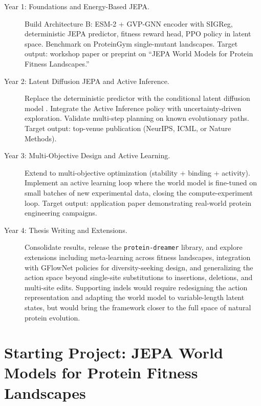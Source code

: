 \documentclass[12pt, a4paper]{article}
\begin{document}
\begin{description}
    \item[Year 1: Foundations and Energy-Based JEPA.] Build Architecture B: ESM-2 + GVP-GNN encoder with SIGReg, deterministic JEPA predictor, fitness reward head, PPO policy in latent space. Benchmark on ProteinGym single-mutant landscapes. Target output: workshop paper or preprint on ``JEPA World Models for Protein Fitness Landscapes.''

    \item[Year 2: Latent Diffusion JEPA and Active Inference.] Replace the deterministic predictor with the conditional latent diffusion model \citep{ho2020ddpm, rombach2022ldm}. Integrate the Active Inference policy \citep{parr2022active} with uncertainty-driven exploration. Validate multi-step planning on known evolutionary paths. Target output: top-venue publication (NeurIPS, ICML, or Nature Methods).

    \item[Year 3: Multi-Objective Design and Active Learning.] Extend to multi-objective optimization (stability + binding + activity). Implement an active learning loop where the world model is fine-tuned on small batches of new experimental data, closing the compute-experiment loop. Target output: application paper demonstrating real-world protein engineering campaigns.

    \item[Year 4: Thesis Writing and Extensions.] Consolidate results, release the \texttt{protein-dreamer} library, and explore extensions including meta-learning across fitness landscapes, integration with GFlowNet \citep{jain2022gflownets} policies for diversity-seeking design, and generalizing the action space beyond single-site substitutions to insertions, deletions, and multi-site edits. Supporting indels would require redesigning the action representation and adapting the world model to variable-length latent states, but would bring the framework closer to the full space of natural protein evolution.
\end{description}


\section{Starting Project: JEPA World Models for Protein Fitness Landscapes}
\label{sec:starting_project}
\end{document}
